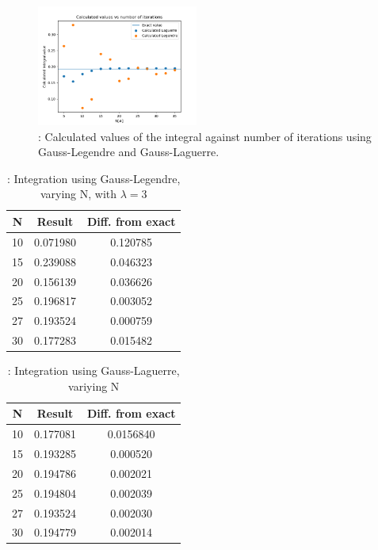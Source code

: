 \documentclass{article}
\begin{document}
	\begin{figure}[hbt]
	\begin{center}
			\includegraphics[width=200px]{Leg_lag_int.png}
			\caption{: Calculated values of the integral against number of iterations using Gauss-Legendre and Gauss-Laguerre.}
			\label{fig:int}
	\end{center}
	\end{figure}

	\begin{table}[h!]
		\caption{: Integration using Gauss-Legendre, varying N, with $\lambda=3$ }
			\label{Tab: Legendre}
		\begin{tabular}{c c c}
			N & Result & Diff. from exact \\
			\hline
			10 & 0.071980 & 0.120785 \\
			15 & 0.239088 & 0.046323 \\
			20 & 0.156139 & 0.036626 \\
			25 & 0.196817 & 0.003052 \\
			27 & 0.193524 & 0.000759 \\
			30 & 0.177283 & 0.015482 \\
		\end{tabular}
	\end{table}

	\begin{table}[h!]
		\caption{: Integration using Gauss-Laguerre, variying N}
		\begin{tabular}{c c c}
			N & Result & Diff. from exact \\
			\hline
			10 & 0.177081 & 0.0156840 \\
			15 & 0.193285 & 0.000520 \\
			20 & 0.194786 & 0.002021 \\
			25 & 0.194804 & 0.002039 \\
			27 & 0.193524 & 0.002030 \\
			30 & 0.194779 & 0.002014 \\
		\end{tabular}
		\label{Tab: Laguerre}
	\end{table}
\end{document}
